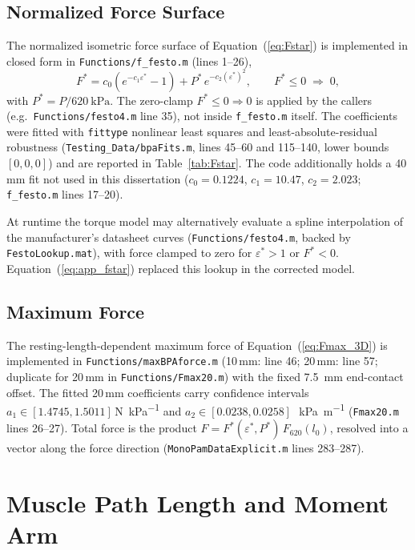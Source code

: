 \subsection{Normalized Force Surface}
The normalized isometric force surface of Equation~(\ref{eq:Fstar}) is implemented in closed form in \texttt{Functions/f\_festo.m} (lines 1--26),
\begin{equation}
    F^{*} = c_{0}\left(e^{-c_{1}\varepsilon^{*}} - 1\right)
            + P^{*}\,e^{-c_{2}(\varepsilon^{*})^{2}},
    \qquad F^{*}\le 0 \;\Rightarrow\; 0,
    \label{eq:app_fstar}
\end{equation}
with $P^{*} = P/\qty{620}{\kPa}$. The zero-clamp $F^{*}\le 0 \Rightarrow 0$ is applied by the callers (e.g.\ \texttt{Functions/festo4.m} line 35), not inside \texttt{f\_festo.m} itself. The coefficients were fitted with \texttt{fittype} nonlinear least squares and least-absolute-residual robustness (\texttt{Testing\_Data/bpaFits.m}, lines 45--60 and 115--140, lower bounds $[0,0,0]$) and are reported in Table~\ref{tab:Fstar}. The code additionally holds a 40\,mm fit not used in this dissertation ($c_0 = 0.1224$, $c_1 = 10.47$, $c_2 = 2.023$; \texttt{f\_festo.m} lines 17--20).

At runtime the torque model may alternatively evaluate a spline interpolation of the manufacturer's datasheet curves (\texttt{Functions/festo4.m}, backed by \texttt{FestoLookup.mat}), with force clamped to zero for $\varepsilon^{*}>1$ or $F^{*}<0$. Equation~(\ref{eq:app_fstar}) replaced this lookup in the corrected model.

\subsection{Maximum Force}
The resting-length-dependent maximum force of Equation~(\ref{eq:Fmax_3D}) is implemented in \texttt{Functions/maxBPAforce.m} (10\,mm: line 46; 20\,mm: line 57; duplicate for 20\,mm in \texttt{Functions/Fmax20.m}) with the fixed \qty{7.5}{\mm} end-contact offset. The fitted 20\,mm coefficients carry confidence intervals $a_1 \in [1.4745, 1.5011]$\,\si{\N\per\kPa} and $a_2 \in [0.0238, 0.0258]$\,\si{\per\kPa\per\metre} (\texttt{Fmax20.m} lines 26--27). Total force is the product $F = F^{*}(\varepsilon^{*},P^{*})\,F_{620}(l_{0})$, resolved into a vector along the force direction (\texttt{MonoPamDataExplicit.m} lines 283--287).

\section{Muscle Path Length and Moment Arm}

